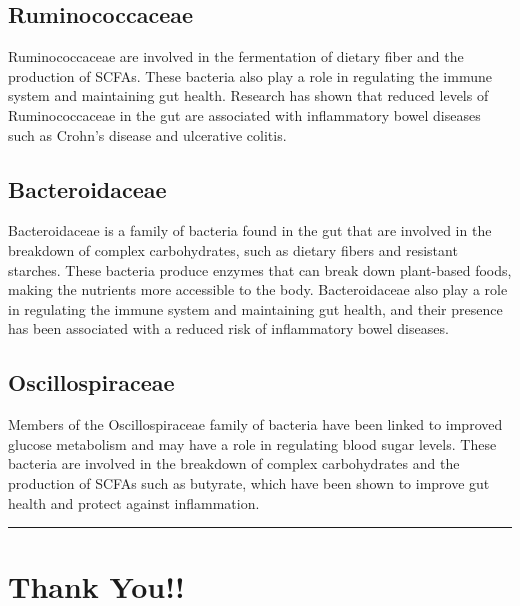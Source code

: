 \documentclass[
]{article}
\begin{document}
\subsection{Ruminococcaceae}

\begin{small}
Ruminococcaceae are involved in the fermentation of dietary fiber and the 
production of SCFAs. These bacteria also play a role in regulating the immune 
system and maintaining gut health. Research has shown that reduced levels of 
Ruminococcaceae in the gut are associated with inflammatory bowel diseases such 
as Crohn's disease and ulcerative colitis.
\end{small}

\subsection{Bacteroidaceae}

\begin{small}
Bacteroidaceae is a family of bacteria found in the gut that are involved in the
breakdown of complex carbohydrates, such as dietary fibers and resistant 
starches. These bacteria produce enzymes that can break down plant-based foods, 
making the nutrients more accessible to the body. Bacteroidaceae also play a 
role in regulating the immune system and maintaining gut health, and their 
presence has been associated with a reduced risk of inflammatory bowel diseases.
\end{small}

\subsection{Oscillospiraceae}

\begin{small}
Members of the Oscillospiraceae family of bacteria have been linked to improved 
glucose metabolism and may have a role in regulating blood sugar levels. These 
bacteria are involved in the breakdown of complex carbohydrates and the 
production of SCFAs such as butyrate, which have been shown to improve gut 
health and protect against inflammation.
\end{small}

\vfill

\hrule
\vfill
\section{Thank You!!}
\end{document}
